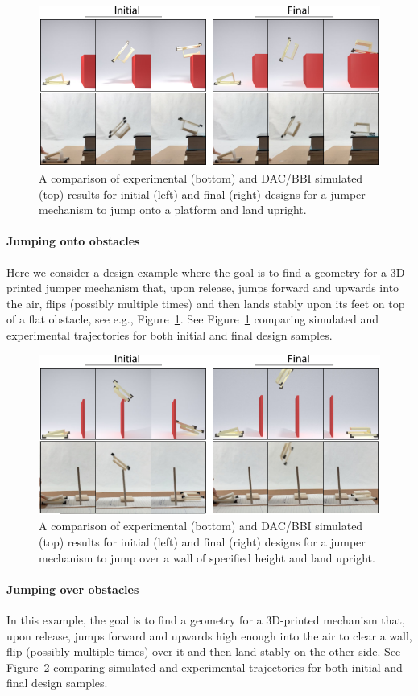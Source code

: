 \begin{figure}[h!]
	\centering
\includegraphics[width=0.7\columnwidth]{./figs/ResultsOnto.pdf}
\caption{A comparison of experimental (bottom) and DAC/BBI simulated (top) results for initial (left) and final (right) designs for a jumper mechanism to jump onto a platform and land upright.}
\label{fig:onto}	
\end{figure}

\paragraph{Jumping onto obstacles}
Here we consider a design example where the goal is  
to find a geometry for a 3D-printed jumper mechanism that, upon release, jumps forward and upwards into the air, flips (possibly multiple times) and then lands stably upon its feet on top of a flat obstacle, see e.g., Figure~\ref{fig:onto}. 
See Figure~\ref{fig:onto} comparing simulated and experimental trajectories for both initial and final design samples.

\begin{figure}[h!]
	\centering
\includegraphics[width=0.7\columnwidth]{./figs/ResultsOver.pdf}
\caption{A comparison of experimental (bottom) and DAC/BBI simulated (top) results for initial (left) and final (right) designs for a jumper mechanism to jump over a wall of specified height and land upright.}
\label{fig:over}	
\end{figure}

\paragraph{Jumping over obstacles}
In this example, the goal is to find a geometry for a 3D-printed mechanism that, upon release, jumps forward and upwards high enough into the air to clear a wall, flip (possibly multiple times) over it and then land stably on the other side. 
See Figure~\ref{fig:over} comparing simulated and experimental trajectories for both initial and final design samples.

